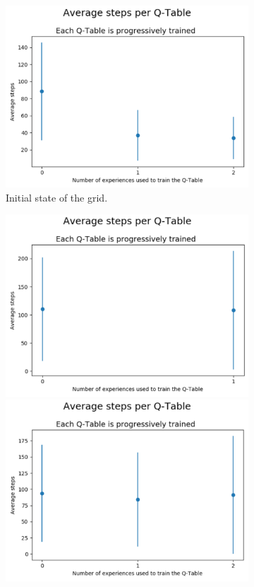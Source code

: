 \documentclass[journal]{IEEEtran}
\begin{document}
\begin{figure}[h!]
\begin{subfigure}{0.5\textwidth}
 \includegraphics[scale=0.2]{Images/Average_steps/juan.png} 
\caption{Initial state of the grid.}
\label{fig:subim1}
\end{subfigure}
\begin{subfigure}{0.5\textwidth}
 \includegraphics[scale=0.2]{Images/Average_steps/manu.png} 
  \includegraphics[scale=0.2]{Images/Average_steps/marta.png} 

\end{subfigure}
\end{figure}
\end{document}
